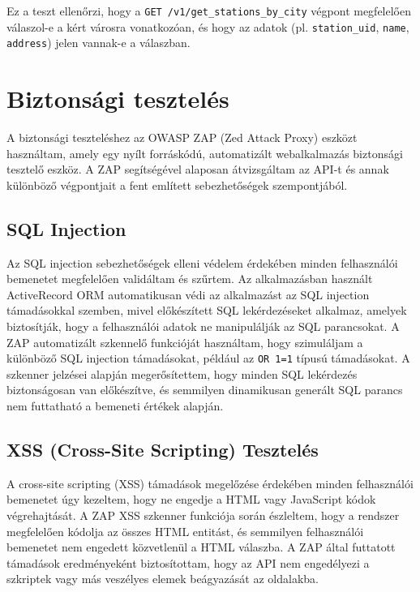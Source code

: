 Ez a teszt ellenőrzi, hogy a \texttt{GET /v1/get\_stations\_by\_city} végpont megfelelően válaszol-e a kért városra vonatkozóan, és hogy az adatok (pl. \texttt{station\_uid}, \texttt{name}, \texttt{address}) jelen vannak-e a válaszban.

\section{Biztonsági tesztelés}

A biztonsági teszteléshez az OWASP ZAP (Zed Attack Proxy) eszközt használtam, amely egy nyílt forráskódú, automatizált webalkalmazás biztonsági tesztelő eszköz. A ZAP segítségével alaposan átvizsgáltam az API-t és annak különböző végpontjait a fent említett sebezhetőségek szempontjából.

\subsection{SQL Injection}

Az SQL injection sebezhetőségek elleni védelem érdekében minden felhasználói bemenetet megfelelően validáltam és szűrtem. Az alkalmazásban használt ActiveRecord ORM automatikusan védi az alkalmazást az SQL injection támadásokkal szemben, mivel előkészített SQL lekérdezéseket alkalmaz, amelyek biztosítják, hogy a felhasználói adatok ne manipulálják az SQL parancsokat. A ZAP automatizált szkennelő funkcióját használtam, hogy szimuláljam a különböző SQL injection támadásokat, például az \texttt{OR 1=1} típusú támadásokat. A szkenner jelzései alapján megerősítettem, hogy minden SQL lekérdezés biztonságosan van előkészítve, és semmilyen dinamikusan generált SQL parancs nem futtatható a bemeneti értékek alapján.

\subsection{XSS (Cross-Site Scripting) Tesztelés}

A cross-site scripting (XSS) támadások megelőzése érdekében minden felhasználói bemenetet úgy kezeltem, hogy ne engedje a HTML vagy JavaScript kódok végrehajtását. A ZAP XSS szkenner funkciója során észleltem, hogy a rendszer megfelelően kódolja az összes HTML entitást, és semmilyen felhasználói bemenetet nem engedett közvetlenül a HTML válaszba. A ZAP által futtatott támadások eredményeként biztosítottam, hogy az API nem engedélyezi a szkriptek vagy más veszélyes elemek beágyazását az oldalakba.


